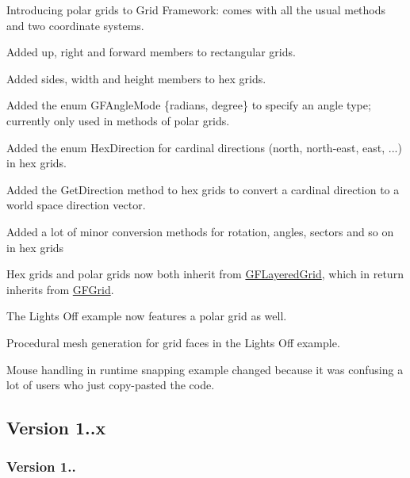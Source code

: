 Introducing polar grids to Grid Framework\+: comes with all the usual methods and two coordinate systems.
\begin{DoxyItemize}
\item Added {\ttfamily up}, {\ttfamily right} and {\ttfamily forward} members to rectangular grids.
\item Added {\ttfamily sides}, {\ttfamily width} and {\ttfamily height} members to hex grids.
\item Added the enum {\ttfamily G\+F\+Angle\+Mode \{radians, degree\}} to specify an angle type; currently only used in methods of polar grids.
\item Added the enum {\ttfamily Hex\+Direction} for cardinal directions (north, north-\/east, east, ...) in hex grids.
\item Added the {\ttfamily Get\+Direction} method to hex grids to convert a cardinal direction to a world space direction vector.
\item Added a lot of minor conversion methods for rotation, angles, sectors and so on in hex grids
\item Hex grids and polar grids now both inherit from {\ttfamily \hyperlink{class_g_f_layered_grid}{G\+F\+Layered\+Grid}}, which in return inherits from {\ttfamily \hyperlink{class_g_f_grid}{G\+F\+Grid}}.
\item The Lights Off example now features a polar grid as well.
\item Procedural mesh generation for grid faces in the Lights Off example.
\item Mouse handling in runtime snapping example changed because it was confusing a lot of users who just copy-\/pasted the code. 


\end{DoxyItemize}

\subsection*{Version 1..\+x }

\subsubsection*{Version 1..}


